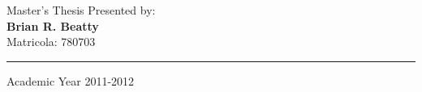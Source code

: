 \begin{titlepage}
\begin{flushleft}
\end{flushleft}
\vspace*{0.5cm}
\begin{flushright}


  Master's Thesis Presented by:\\ \vspace*{0.5em}\textbf{\LARGE Brian R. Beatty}\\ \vspace*{0.5em}\normalsize Matricola: 780703 \\ 
\vspace*{2em}
\rule{\linewidth}{0.5mm}

\end{flushright}
\vspace*{0.5cm}
\begin{center}



  Academic Year 2011-2012
\end{center} \clearpage

\end{titlepage}